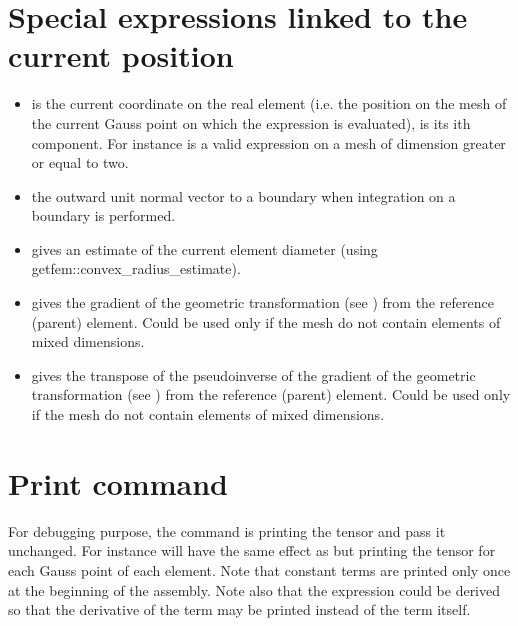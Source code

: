 \documentclass[a4paper,11pt,english]{sphinxmanual}
\begin{document}
\section{Special expressions linked to the current position}
\label{\detokenize{userdoc/gasm_high:special-expressions-linked-to-the-current-position}}\begin{itemize}
\item {} 
 is the current coordinate on the real element (i.e. the position on the mesh of the current Gauss point on which the expression is evaluated),  is its i\sphinxhyphen{}th component. For instance  is a valid expression on a mesh of dimension greater or equal to two.

\item {} 
 the outward unit normal vector to a boundary when integration on a boundary is performed.

\item {} 
 gives an estimate of the current element diameter (using getfem::convex\_radius\_estimate).

\item {} 
 gives the gradient of the geometric transformation (see ) from the reference (parent) element. Could be used only if the mesh do not contain elements of mixed dimensions.

\item {} 
 gives the transpose of the pseudo\sphinxhyphen{}inverse of the gradient of the geometric transformation (see ) from the reference (parent) element. Could be used only if the mesh do not contain elements of mixed dimensions.

\end{itemize}


\section{Print command}
\label{\detokenize{userdoc/gasm_high:print-command}}
For debugging purpose, the command  is printing the tensor  and pass it unchanged. For instance   will have the same effect as  but printing the tensor  for each Gauss point of each element. Note that constant terms are printed only once at the beginning of the assembly. Note also that the expression could be derived so that the derivative of the term may be printed instead of the term itself.
\end{document}
